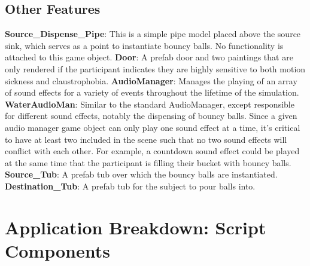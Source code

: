 \documentclass{article}
\begin{document}
\subsection{Other Features} 
\textbf{Source\_Dispense\_Pipe}: This is a simple pipe model placed above the source sink, which serves as a point to instantiate bouncy balls. No functionality is attached to this game object.\newline \newline
\textbf{Door}: A prefab door and two paintings that are only rendered if the participant indicates they are highly sensitive to both motion sickness and claustrophobia.\newline \newline
\textbf{AudioManager}: Manages the playing of an array of sound effects for a variety of events throughout the lifetime of the simulation. \newline \newline
\textbf{WaterAudioMan}: Similar to the standard AudioManager, except responsible for different sound effects, notably the dispensing of bouncy balls. Since a given audio manager game object can only play one sound effect at a time, it's critical to have at least two included in the scene such that no two sound effects will conflict with each other. For example, a countdown sound effect could be played at the same time that the participant is filling their bucket with bouncy balls. \newline \newline
\textbf{Source\_Tub}: A prefab tub over which the bouncy balls are instantiated. \newline \newline
\textbf{Destination\_Tub}: A prefab tub for the subject to pour balls into. 


\pagebreak\section{Application Breakdown: Script Components}
\end{document}
